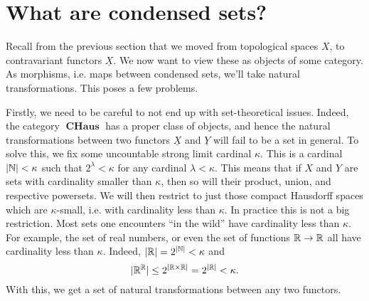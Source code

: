 \documentclass{article}
\DeclareMathOperator{\CHaus}{\mathbf{CHaus}}
\begin{document}
\section{What are condensed sets?}

Recall from the previous section that we moved from
topological spaces $X$, to contravariant functors $\underline{X}$.
We now want to view these as objects of some category.
As morphisms,
i.e. maps between condensed sets, we'll take natural transformations.
This poses a few problems.

Firstly,
we need to be careful to not end up with set-theoretical
issues. Indeed, the category $\CHaus$ has a proper class
of objects, and hence the natural transformations between
two functors $\underline{X}$ and $\underline{Y}$ will fail
to be a set in general. To solve this, we fix some
uncountable strong limit cardinal $\kappa$. This is
a cardinal $|\mathbb{N}| < \kappa$ such that $2^\lambda < \kappa$ for any
cardinal $\lambda < \kappa$. This means that
if $X$ and $Y$ are sets with cardinality smaller than $\kappa$,
then so will their product, union, and respective powersets.
We will then restrict to just those compact Hausdorff spaces
which are $\kappa$-small, i.e. with cardinality less than $\kappa$.
In practice this is not a big restriction. Most sets one encounters
``in the wild''
have cardinality less than $\kappa$. For example, the set of
real numbers, or even the set of functions $\mathbb{R} \to \mathbb{R}$ all have
cardinality less than $\kappa$. Indeed, $|\mathbb{R}| = 2^{|\mathbb{N}|} < \kappa$
and
\begin{equation*}
    |\mathbb{R}^{\mathbb{R}}| \leq 2^{|\mathbb{R}\times \mathbb{R}|}
    = 2^{|\mathbb{R}|} < \kappa.
\end{equation*}
With this, we get a set of natural transformations between
any two functors.
\end{document}
